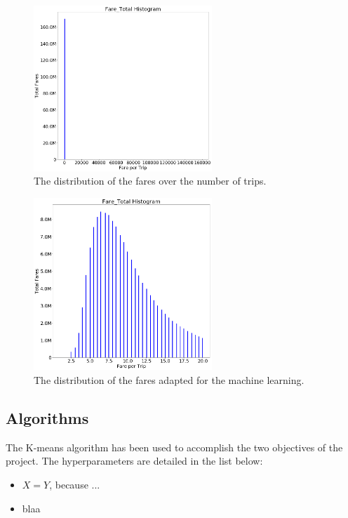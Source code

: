 \documentclass[a4paper]{article}
\begin{document}
\begin{figure}
  \centering
  \includegraphics[width=0.6\textwidth]{images/distribution-fares-bad.png}
  \caption{The distribution of the fares over the number of trips.}
  \label{fig:distribution-fares-bad}
\end{figure}

\begin{figure}
  \centering
  \includegraphics[width=0.6\textwidth]{images/distribution-fares-fix.png}
  \caption{The distribution of the fares adapted for the machine learning.}
  \label{fig:distribution-fares-fixed}
\end{figure}


\subsection{Algorithms}
The K-means algorithm has been used to accomplish the two objectives of the project. The hyperparameters are detailed in the list below:

\begin{itemize}
  \item $X=Y$, because ...
  \item blaa
\end{itemize}
\end{document}
